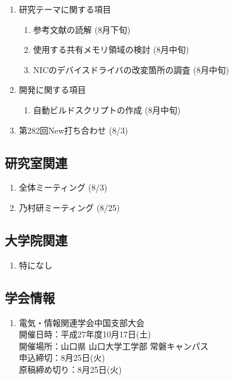 \documentclass[fleqn, 14pt]{extarticle}
\begin{document}
\begin{enumerate}

\item 研究テーマに関する項目
\hfill
\begin{enumerate}


\item 参考文献の読解
\hfill
(8月下旬)

\item 使用する共有メモリ領域の検討
\hfill
(8月中旬)

\item NICのデバイスドライバの改変箇所の調査
\hfill
(8月中旬)

\end{enumerate}
\item 開発に関する項目
\hfill
\begin{enumerate}

\item 自動ビルドスクリプトの作成
\hfill
(8月中旬)

\end{enumerate}

\item 第282回New打ち合わせ
\hfill
\label{enum-7}
(8/3)

\end{enumerate}
\subsection{研究室関連}
\label{sec-4-2}

\begin{enumerate}

\item 全体ミーティング
\hfill
\label{enum-18}
(8/3)

\item 乃村研ミーティング 
\hfill
\label{enum-18}
(8/25)

\end{enumerate}

\subsection{大学院関連}
\begin{enumerate}

\item 特になし
\hfill
\label{enum-17}


\end{enumerate}

\subsection{学会情報} 
\begin{enumerate}
    \item 電気・情報関連学会中国支部大会\\
        開催日時：平成27年度10月17日(土)\\
        開催場所：山口県 山口大学工学部 常磐キャンパス\\
        申込締切：8月25日(火)\\
        原稿締め切り：8月25日(火)\\
\end{enumerate}
\end{document}

